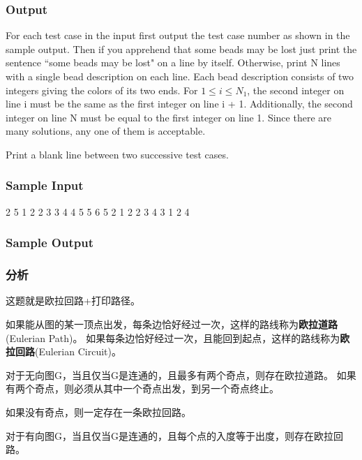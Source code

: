 \subsubsection{Output}
For each test case in the input first output the test case number as shown in the sample output. Then 
if you apprehend that some beads may be lost just print the sentence ``some beads may be lost" on a 
line by itself. Otherwise, print N lines with a single bead description on each line. Each bead 
description consists of two integers giving the colors of its two ends. For $1 \leq i \leq N_1$, the second integer 
on line i must be the same as the first integer on line i + 1. Additionally, the second integer 
on line N must be equal to the first integer on line 1. Since there are many solutions, any one
 of them is acceptable.

Print a blank line between two successive test cases.

\subsubsection{Sample Input}
\begin{Code}
2
5
1 2
2 3
3 4
4 5
5 6
5
2 1
2 2
3 4
3 1
2 4
\end{Code}

\subsubsection{Sample Output}

\subsubsection{分析}
这题就是欧拉回路+打印路径。

如果能从图的某一顶点出发，每条边恰好经过一次，这样的路线称为\textbf{欧拉道路}(Eulerian Path)。
如果每条边恰好经过一次，且能回到起点，这样的路线称为\textbf{欧拉回路}(Eulerian Circuit)。

对于无向图G，当且仅当G是连通的，且最多有两个奇点，则存在欧拉道路。
如果有两个奇点，则必须从其中一个奇点出发，到另一个奇点终止。

如果没有奇点，则一定存在一条欧拉回路。

对于有向图G，当且仅当G是连通的，且每个点的入度等于出度，则存在欧拉回路。

